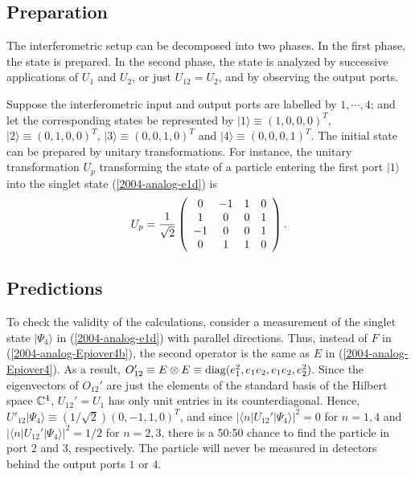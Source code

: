 \documentclass[pra,showpacs,showkeys,amsfonts]{revtex4}
\begin{document}
\subsection{Preparation}
The interferometric setup can be decomposed into two phases.
In the first phase, the state is prepared.
In the second phase, the state is analyzed by successive applications
of $U_1$ and $U_2$, or just $U_{12}=U_2$, and by observing the output ports.

Suppose the interferometric input and output
ports are labelled by $1,\cdots ,4$; and let the corresponding  states
be represented by
$\vert 1\rangle \equiv (1,0,0,0)^T$,
$\vert 2\rangle \equiv (0,1,0,0)^T$,
$\vert 3\rangle \equiv (0,0,1,0)^T$
and
$\vert 4\rangle \equiv (0,0,0,1)^T$.
The initial state can be prepared by unitary transformations.
For instance, the unitary transformation $U_p$ transforming
the state of a particle entering the first port
$\vert 1\rangle $
into the singlet state
(\ref{2004-analog-e1d})
is
\begin{equation}
U_p = {1\over  \sqrt{2}}
\left(
\begin{array}{cccc}
0& -1& 1& 0\\
1& 0& 0& 1\\
-1& 0& 0& 1    \\
0& 1& 1& 0
\end{array}
\right)
.        \label{2004-analog-eprep2}
\end{equation}

\subsection{Predictions}


To check the validity of the calculations, consider a measurement
of the singlet state $\vert \Psi_4\rangle$ in (\ref{2004-analog-e1d}) with parallel directions.
Thus, instead of $F$ in
(\ref{2004-analog-Epiover4b}),
the second operator is the same as $E$ in
(\ref{2004-analog-Epiover4}).
As a result,
$O_{12}' \equiv E \otimes E \equiv {\rm diag}(e_1^2,e_1e_2,e_1e_2,e_2^2)$.
Since the eigenvectors of $O_{12}'$ are just the elements
of the standard basis of the Hilbert space
${\Bbb C}^4$,
$U_{12}'=U_1$ has only unit entries in its counterdiagonal.
Hence,
$U'_{12}\vert \Psi_4\rangle \equiv (1/\sqrt{2})(0,-1,1,0)^T$,
and since
$\vert \langle n \vert U_{12}'\vert \Psi_4\rangle \vert^2 =0$ for
$n=1,4$ and
$\vert \langle n \vert U_{12}'\vert \Psi_4\rangle \vert^2 =1/2$ for
$n=2,3$,
there is a 50:50 chance to find the particle in port $2$ and $3$,
respectively.
The particle will never be measured in detectors behind the output ports
$1$ or $4$.
\end{document}
